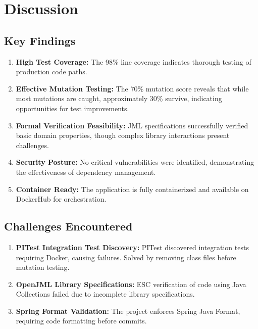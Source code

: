 \documentclass[sigconf]{acmart}
\begin{document}
\section{Discussion}

\subsection{Key Findings}

\begin{enumerate}
    \item \textbf{High Test Coverage:} The 98\% line coverage indicates thorough testing of production code paths.
    
    \item \textbf{Effective Mutation Testing:} The 70\% mutation score reveals that while most mutations are caught, approximately 30\% survive, indicating opportunities for test improvements.
    
    \item \textbf{Formal Verification Feasibility:} JML specifications successfully verified basic domain properties, though complex library interactions present challenges.
    
    \item \textbf{Security Posture:} No critical vulnerabilities were identified, demonstrating the effectiveness of dependency management.
    
    \item \textbf{Container Ready:} The application is fully containerized and available on DockerHub for orchestration.
\end{enumerate}

\subsection{Challenges Encountered}

\begin{enumerate}
    \item \textbf{PITest Integration Test Discovery:} PITest discovered integration tests requiring Docker, causing failures. Solved by removing class files before mutation testing.
    
    \item \textbf{OpenJML Library Specifications:} ESC verification of code using Java Collections failed due to incomplete library specifications.
    
    \item \textbf{Spring Format Validation:} The project enforces Spring Java Format, requiring code formatting before commits.
\end{enumerate}
\end{document}
